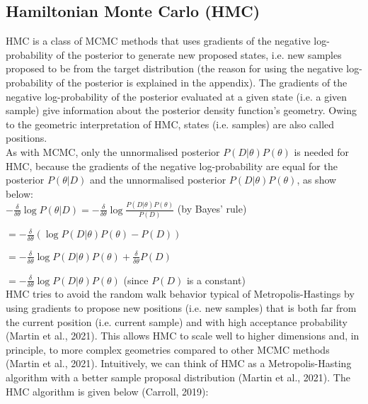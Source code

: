 \documentclass[conference]{IEEEtran}
\begin{document}
\subsection{Hamiltonian Monte Carlo (HMC)}
HMC is a class of MCMC methods that uses gradients of the negative log-probability of the posterior to generate new proposed states, i.e. new samples proposed to be from the target distribution (the reason for using the negative log-probability of the posterior is explained in the appendix). The gradients of the negative log-probability of the posterior evaluated at a given state (i.e. a given sample) give information about the posterior density function's geometry. Owing to the geometric interpretation of HMC, states (i.e. samples) are also called positions.\\

As with MCMC, only the unnormalised posterior $P(D|\theta)P(\theta)$ is needed for HMC, because the gradients of the negative log-probability are equal for the posterior $P(\theta|D)$ and the unnormalised posterior $P(D|\theta)P(\theta)$, as show below:\\

$\displaystyle - \frac{\delta}{\delta \theta} \log P(\theta|D) = - \frac{\delta}{\delta \theta} \log \frac{P(D|\theta)P(\theta)}{P(D)}$ (by Bayes' rule)

$\displaystyle = - \frac{\delta}{\delta \theta} (\log P(D|\theta) P(\theta) - P(D))$

$\displaystyle = - \frac{\delta}{\delta \theta} \log P(D|\theta) P(\theta) + \frac{\delta}{\delta \theta} P(D)$

$\displaystyle = - \frac{\delta}{\delta \theta} \log P(D|\theta) P(\theta)$ (since $P(D)$ is a constant) \\

HMC tries to avoid the random walk behavior typical of Metropolis-Hastings by using gradients to propose new positions (i.e. new samples) that is both far from the current position (i.e. current sample) and with high acceptance probability (Martin et al., 2021). This allows HMC to scale well to higher dimensions and, in principle, to more complex geometries compared to other MCMC methods (Martin et al., 2021). Intuitively, we can think of HMC as a Metropolis-Hasting algorithm with a better sample proposal distribution (Martin et al., 2021). The HMC algorithm is given below (Carroll, 2019):\\
\end{document}
